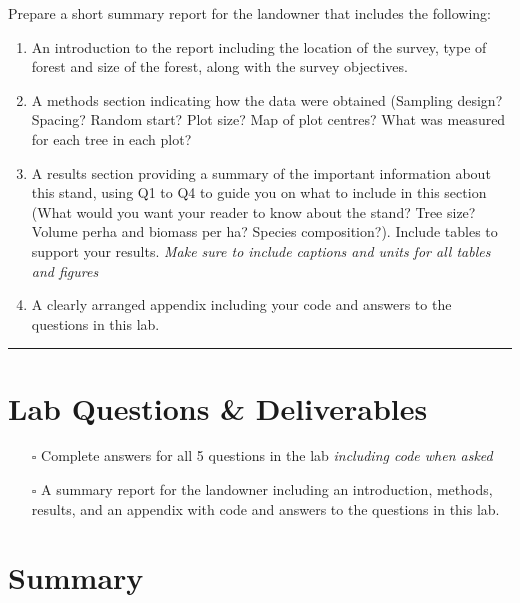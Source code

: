 \documentclass[
  letterpaper,
]{book}
\providecommand{\tightlist}{%
  \setlength{\itemsep}{0pt}\setlength{\parskip}{0pt}}\usepackage{longtable,booktabs,array}
\begin{document}

Prepare a short summary report for the landowner that includes the
following:

\begin{enumerate}
\def\labelenumi{\Alph{enumi}.}
\tightlist
\item
  An introduction to the report including the location of the survey,
  type of forest and size of the forest, along with the survey
  objectives.
\item
  A methods section indicating how the data were obtained (Sampling
  design? Spacing? Random start? Plot size? Map of plot centres? What
  was measured for each tree in each plot?
\item
  A results section providing a summary of the important information
  about this stand, using Q1 to Q4 to guide you on what to include in
  this section (What would you want your reader to know about the stand?
  Tree size? Volume perha and biomass per ha? Species composition?).
  Include tables to support your results. \emph{Make sure to include
  captions and units for all tables and figures}
\item
  A clearly arranged appendix including your code and answers to the
  questions in this lab.
\end{enumerate}

\begin{center}\rule{0.5\linewidth}{0.5pt}\end{center}

\hypertarget{lab-questions-deliverables-3}{%
\section*{Lab Questions \&
Deliverables}\label{lab-questions-deliverables-3}}


\begin{itemize}
\tightlist
\item[$\square$]
  Complete answers for all 5 questions in the lab \emph{including code
  when asked}
\item[$\square$]
  A summary report for the landowner including an introduction, methods,
  results, and an appendix with code and answers to the questions in
  this lab.
\end{itemize}

\hypertarget{summary-3}{%
\section*{Summary}\label{summary-3}}
\end{document}
